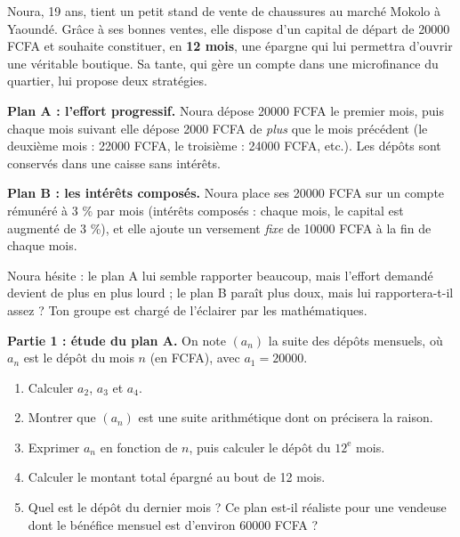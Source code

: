 \documentclass[11pt]{article}
\newcounter{popsec}
\newcounter{popsub}
\newcommand{\courssub}[1]{%
  \stepcounter{popsub}%
  \par\vspace{9pt}\noindent{\popxbold\fontsize{11.5}{13}\selectfont\color{popink}{\color{poporange}\thepopsec.\thepopsub}\hspace{6pt}#1}\par\nopagebreak\vspace{4pt}
}
\begin{document}
\begin{experience}
Noura, 19 ans, tient un petit stand de vente de chaussures au marché Mokolo à Yaoundé. Grâce à ses bonnes ventes, elle dispose d'un capital de départ de \num{20000} FCFA et souhaite constituer, en \textbf{12 mois}, une épargne qui lui permettra d'ouvrir une véritable boutique. Sa tante, qui gère un compte dans une microfinance du quartier, lui propose deux stratégies.

\textbf{Plan A : l'effort progressif.} Noura dépose \num{20000} FCFA le premier mois, puis chaque mois suivant elle dépose \num{2000} FCFA de \emph{plus} que le mois précédent (le deuxième mois : \num{22000} FCFA, le troisième : \num{24000} FCFA, etc.). Les dépôts sont conservés dans une caisse sans intérêts.

\textbf{Plan B : les intérêts composés.} Noura place ses \num{20000} FCFA sur un compte rémunéré à \num{3} \% par mois (intérêts composés : chaque mois, le capital est augmenté de \num{3} \%), et elle ajoute un versement \emph{fixe} de \num{10000} FCFA à la fin de chaque mois.

Noura hésite : le plan A lui semble rapporter beaucoup, mais l'effort demandé devient de plus en plus lourd ; le plan B paraît plus doux, mais lui rapportera-t-il assez ? Ton groupe est chargé de l'éclairer par les mathématiques.
\end{experience}

\courssub{Consignes}

\textbf{Partie 1 : étude du plan A.} On note $(a_n)$ la suite des dépôts mensuels, où $a_n$ est le dépôt du mois $n$ (en FCFA), avec $a_1=\num{20000}$.
\begin{enumerate}
\item Calculer $a_2$, $a_3$ et $a_4$.
\item Montrer que $(a_n)$ est une suite arithmétique dont on précisera la raison.
\item Exprimer $a_n$ en fonction de $n$, puis calculer le dépôt du $12^{\text{e}}$ mois.
\item Calculer le montant total épargné au bout de 12 mois.
\item Quel est le dépôt du dernier mois ? Ce plan est-il réaliste pour une vendeuse dont le bénéfice mensuel est d'environ \num{60000} FCFA ?
\end{enumerate}
\end{document}
